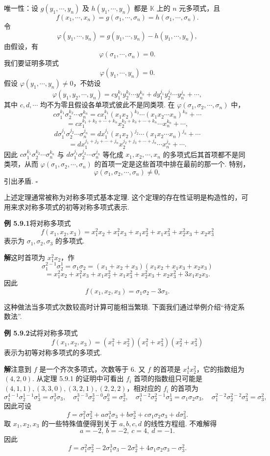 \documentclass[UTF8, 12pt, fontset=fandol, oneside]{ctexart}
\begin{document}
唯一性：设 $g(y_1,\cdots,y_n)$ 及 $h(y_1,\cdots,y_n)$ 都是 $\mathbb{K}$ 上的 $n$ 元多项式，且
\[
f(x_1,\cdots,x_n)=g(\sigma_1,\cdots,\sigma_n)=h(\sigma_1,\cdots,\sigma_n).
\]
令
\[
\varphi(y_1,\cdots,y_n)=g(y_1,\cdots,y_n)-h(y_1,\cdots,y_n),
\]
由假设，有
\[
\varphi(\sigma_1,\cdots,\sigma_n)=0.
\]
我们要证明多项式
\[
\varphi(y_1,\cdots,y_n)=0.
\]
假设 $\varphi(y_1,\cdots,y_n)\neq 0$，不妨设
\[
\varphi(y_1,y_2,\cdots,y_n)=cy_1^{k_1}y_2^{k_2}\cdots y_n^{k_n}+dy_1^{j_1}y_2^{j_2}\cdots y_n^{j_n}+\cdots,
\]
其中 $c,d,\cdots$ 均不为零且假设各单项式彼此不是同类项. 在 $\varphi(\sigma_1,\sigma_2,\cdots,\sigma_n)$ 中，
\[
c\sigma_1^{k_1}\sigma_2^{k_2}\cdots\sigma_n^{k_n}
=cx_1^{k_1}(x_1x_2)^{k_2}\cdots(x_1x_2\cdots x_n)^{k_n}+\cdots
\]
\[
=cx_1^{k_1+k_2+\cdots+k_n}x_2^{k_2+k_3+\cdots+k_n}\cdots x_n^{k_n}+\cdots,
\]
\[
d\sigma_1^{j_1}\sigma_2^{j_2}\cdots\sigma_n^{j_n}
=dx_1^{j_1}(x_1x_2)^{j_2}\cdots(x_1x_2\cdots x_n)^{j_n}+\cdots
\]
\[
=dx_1^{j_1+j_2+\cdots+j_n}x_2^{j_2+j_3+\cdots+j_n}\cdots x_n^{j_n}+\cdots.
\]
因此 $c\sigma_1^{k_1}\sigma_2^{k_2}\cdots\sigma_n^{k_n}$ 与 $d\sigma_1^{j_1}\sigma_2^{j_2}\cdots\sigma_n^{j_n}$ 等化成 $x_1,x_2,\cdots,x_n$ 的多项式后其首项都不是同类项，从而 $\varphi(\sigma_1,\sigma_2,\cdots,\sigma_n)$ 的首项一定是这些首项中排在最前的那一个. 特别，
\[
\varphi(\sigma_1,\sigma_2,\cdots,\sigma_n)\neq 0,
\]
引出矛盾. $\square$

上述定理通常被称为对称多项式基本定理. 这个定理的存在性证明是构造性的，可用来求对称多项式的初等对称多项式表示.

\noindent\textbf{例 5.9.1}\quad 将对称多项式
\[
f(x_1,x_2,x_3)=x_1^2x_2+x_1^2x_3+x_1x_2^2+x_1x_3^2+x_2^2x_3+x_2x_3^2
\]
表示为 $\sigma_1,\sigma_2,\sigma_3$ 的多项式.

\noindent\textbf{解}\quad 这时首项为 $x_1^2x_2$，作
\[
\sigma_1^{2-1}\sigma_2^1=\sigma_1\sigma_2=(x_1+x_2+x_3)(x_1x_2+x_1x_3+x_2x_3)
\]
\[
=x_1^2x_2+x_1^2x_3+x_1x_2^2+x_1x_3^2+x_2^2x_3+x_2x_3^2+3x_1x_2x_3.
\]
因此
\[
f(x_1,x_2,x_3)=\sigma_1\sigma_2-3\sigma_3.
\]

这种做法当多项式次数较高时计算可能相当繁琐. 下面我们通过举例介绍“待定系数法”.

\noindent\textbf{例 5.9.2}\quad 试将对称多项式
\[
f(x_1,x_2,x_3)=(x_1^2+x_2^2)(x_1^2+x_3^2)(x_2^2+x_3^2)
\]
表示为初等对称多项式的多项式.

\noindent\textbf{解}\quad 注意到 $f$ 是一个齐次多项式，次数等于 6. 又 $f$ 的首项是 $x_1^4x_2^2$，它的指数组为 $(4,2,0)$. 从定理 5.9.1 的证明中可看出 $f_i$ 首项的指数组只可能是 $(4,1,1),(3,3,0),(3,2,1),(2,2,2)$，相对应的 $f_i$ 的首项为
\[
\sigma_1^{4-1}\sigma_2^{1-1}\sigma_3^1=\sigma_1^3\sigma_3,\quad
\sigma_1^{3-3}\sigma_2^{3-0}\sigma_3^0=\sigma_2^3,\quad
\sigma_1^{3-2}\sigma_2^{2-1}\sigma_3^1=\sigma_1\sigma_2\sigma_3,\quad
\sigma_1^{2-2}\sigma_2^{2-2}\sigma_3^2=\sigma_3^2,
\]
因此可设
\[
f=\sigma_1^2\sigma_2^2+a\sigma_1^3\sigma_3+b\sigma_2^3+c\sigma_1\sigma_2\sigma_3+d\sigma_3^2.
\]
取 $x_1,x_2,x_3$ 的一些特殊值便得到关于 $a,b,c,d$ 的线性方程组. 不难解得
\[
a=-2,\ b=-2,\ c=4,\ d=-1.
\]
因此
\[
f=\sigma_1^2\sigma_2^2-2\sigma_1^3\sigma_3-2\sigma_2^3+4\sigma_1\sigma_2\sigma_3-\sigma_3^2.
\]
\end{document}
